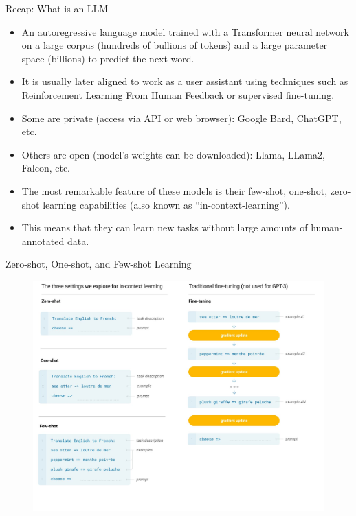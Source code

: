 \documentclass[handout]{beamer}
\begin{document}
\begin{frame}{Recap: What is an LLM}
\begin{scriptsize}
\begin{itemize}
\item  An autoregressive language model trained with a Transformer neural network on a large corpus (hundreds of bullions of tokens) and a large parameter space (billions) to predict the next word.
\item It is usually later aligned to work as a user assistant using techniques such as Reinforcement Learning From Human Feedback  \cite{ouyang2022training} or supervised fine-tuning.
\item Some are private (access via API or web browser): Google Bard, ChatGPT, etc.
\item Others are open (model's weights can be downloaded): Llama, LLama2, Falcon, etc.
\item The most remarkable feature of these models is their few-shot, one-shot, zero-shot learning capabilities (also known as ``in-context-learning'').
\item This means that they can learn new tasks without large amounts of human-annotated data.
\end{itemize}
\end{scriptsize}
\end{frame}

\begin{frame}{Zero-shot, One-shot, and Few-shot Learning}


 \begin{figure}[h]
        	\includegraphics[scale = 0.18]{pics/zeroonefew.png}
        \end{figure}  



\end{frame}
\end{document}
